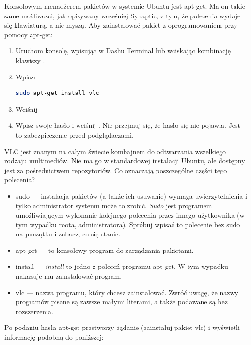 Konsolowym menadżerem pakietów w systemie Ubuntu jest \textcolor{ubuntu_orange}{apt-get}. Ma on takie same możliwości, jak opisywany wcześniej Synaptic, z tym, że polecenia wydaje się klawiaturą, a nie myszą. Aby zainstalować pakiet z oprogramowaniem przy pomocy apt-get:
\begin{enumerate}
\item Uruchom konsolę, wpisując w Dashu \textcolor{ubuntu_orange}{Terminal} lub wciskając kombinację klawiszy .
\item Wpisz:
\begin{lstlisting}[language=bash]
sudo apt-get install vlc
\end{lstlisting}
\item Wciśnij \keys{\returnwin}
\item Wpisz swoje hasło i wciśnij \keys{\returnwin}. Nie przejmuj się, że hasło się nie pojawia. Jest to zabezpieczenie przed podglądaczami.
\end{enumerate}

VLC jest znanym na całym świecie kombajnem do odtwarzania wszelkiego rodzaju multimediów. Nie ma go w standardowej instalacji Ubuntu, ale dostępny jest za pośrednictwem repozytoriów. Co oznaczają poszczególne części tego polecenia?

\begin{itemize}
\item \textcolor{ubuntu_orange}{sudo} --- instalacja pakietów (a także ich usuwanie) wymaga uwierzytelnienia i tylko administrator systemu może to zrobić. \textit{Sudo} jest programem umożliwiającym wykonanie kolejnego polecenia przez innego użytkownika (w tym wypadku roota, administratora). Spróbuj wpisać to polecenie bez sudo na początku i zobacz, co się stanie.
\item \textcolor{ubuntu_orange}{apt-get} --- to konsolowy program do zarządzania pakietami.
\item \textcolor{ubuntu_orange}{install} --- \textit{install} to jedno z poleceń programu apt-get. W tym wypadku nakazuje mu zainstalować program.
\item \textcolor{ubuntu_orange}{vlc} --- nazwa programu, który chcesz zainstalować. Zwróć uwagę, że nazwy programów pisane są zawsze małymi literami, a także podawane są bez rozszerzenia.
\end{itemize}

Po podaniu hasła apt-get przetworzy żądanie (zainstaluj pakiet vlc) i wyświetli informację podobną do poniższej:

